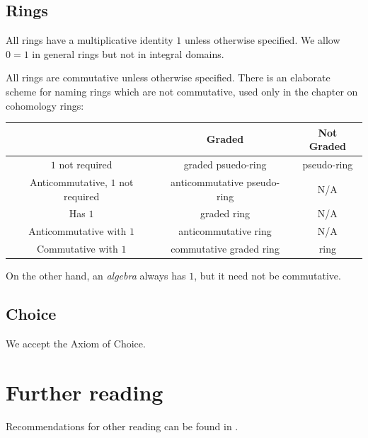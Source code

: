 \subsection*{Rings}
All rings have a multiplicative identity $1$ unless otherwise specified.
We allow $0=1$ in general rings but not in integral domains.

All rings are commutative unless otherwise specified.
There is an elaborate scheme for naming rings which are not commutative,
used only in the chapter on cohomology rings:

\begin{center}
	\small
	\begin{tabular}[h]{|c|cc|}
		\hline
		& Graded & Not Graded \\ \hline
		$1$ not required & graded psuedo-ring & pseudo-ring \\
		Anticommutative, $1$ not required & anticommutative pseudo-ring & N/A \\ 
		Has $1$ & graded ring & N/A \\ 
		Anticommutative with $1$ & anticommutative ring & N/A \\ 
		Commutative with $1$ & commutative graded ring & ring \\ \hline
	\end{tabular}
\end{center}

On the other hand, an \emph{algebra} always has $1$,
but it need not be commutative.

\subsection*{Choice}
We accept the Axiom of Choice.
\section{Further reading}
Recommendations for other reading can be found in .
